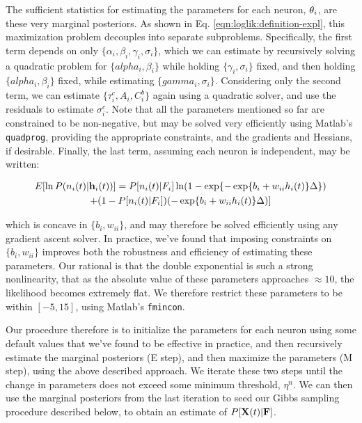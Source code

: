 The sufficient statistics for estimating the parameters for each neuron, $\mathbf{\theta}_i$, are these very marginal posteriors.  As shown in Eq. \eqref{eqn:loglik:definition-expl}, this maximization problem decouples into separate subproblems.  Specifically, the first term depends on only $\{\alpha_i, \beta_i, \gamma_i, \sigma_i\}$, which we can estimate by recursively solving a quadratic problem for $\{alpha_i, \beta_i\}$ while holding $\{\gamma_i, \sigma_i\}$ fixed, and then holding $\{alpha_i, \beta_i\}$ fixed, while estimating $\{gamma_i,\sigma_i\}$.  Considering only the second term, we can estimate $\{\tau_i^c, A_i, C_i^b\}$ again using a quadratic solver, and use the residuals to estimate $\sigma_i^c$.  Note that all the parameters mentioned so far are constrained to be non-negative, but may be solved very efficiently using Matlab's \texttt{quadprog}, providing the appropriate constraints, and the gradients and Hessians, if desirable.  Finally, the last term, assuming each neuron is independent, may be written:

\begin{multline}
	E [\ln P(n_i(t) | \mathbf{h}_i(t))] = P[n_i(t) | F_i] \ln (1-\exp\{-\exp\{b_i + w_{ii} h_i(t)\}\Delta\})
	\\ +  (1-P[n_i(t) | F_i]) (-\exp\{b_i + w_{ii} h_i(t)\}\Delta)] 
\end{multline}

\noindent which is concave in $\{b_i, w_{ii}\}$, and may therefore be solved efficiently using any gradient ascent solver. In practice, we've found that imposing constraints on $\{b_i, w_{ii}\}$ improves both the robustness and efficiency of estimating these parameters.  Our rational is that the double exponential is such a strong nonlinearity, that as the absolute value of these parameters approaches $\approx 10$, the likelihood becomes extremely flat.  We therefore restrict these parameters to be within $[-5,15]$, using Matlab's \texttt{fmincon}.

Our procedure therefore is to initialize the parameters for each neuron using some default values that we've found to be effective in practice, and then recursively estimate the marginal posteriors (E step), and then maximize the parameters (M step), using the above described approach.  We iterate these two steps until the change in parameters does not exceed some minimum threshold, $\eta^n$.  We can then use the marginal posteriors from the last iteration to seed our Gibbs sampling procedure described below, to obtain an estimate of $P[{\bf X}(t) | {\bf F}]$.